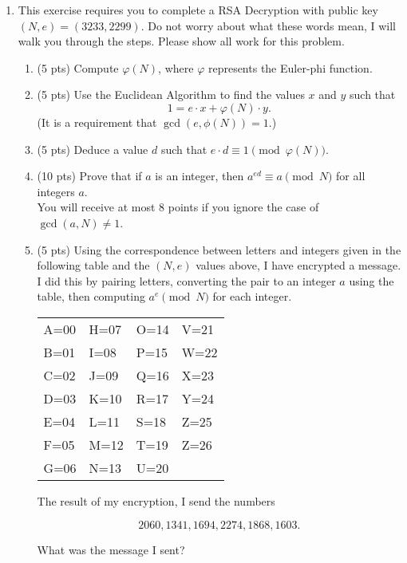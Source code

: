 \documentclass[12pt]{article}
\begin{document}
	\begin{enumerate}
		\item This exercise requires you to complete a RSA Decryption with public key $(N,e)=(3233,2299)$.  Do not worry about what these words mean, I will walk you through the steps. Please show all work for this problem.
		\begin{enumerate}
			\item (5 pts) Compute $\varphi(N)$, where $\varphi$ represents the Euler-phi function.
			\vfill
			\item (5 pts) Use the Euclidean Algorithm to find the values $x$ and $y$ such that
			\[1 = e\cdot x+\varphi(N)\cdot y.\]
			(It is a requirement that $\gcd(e,\phi(N))=1$.)
			\vfill 
			\item (5 pts) Deduce a value $d$ such that $e\cdot d\equiv 1\pmod{\varphi(N)}$.
			\vfill 
			\newpage 
			\item (10 pts) Prove that if $a$ is an integer, then $a^{ed}\equiv a\pmod N$ for all integers $a$.\\
			You will receive at most 8 points if you ignore the case of $\gcd(a,N)\neq 1$.
			\vfill
			\item (5 pts) Using the correspondence between letters and integers given in the following table and the $(N,e)$ values above, I have encrypted a message. I did this by pairing letters, converting the pair to an integer $a$ using the table, then computing $a^e\pmod N$ for each integer.
			\begin{center}
				\begin{tabular}{llll}
					A=00&H=07&O=14&V=21\\
					B=01&I=08&P=15&W=22\\
					C=02&J=09&Q=16&X=23\\
					D=03&K=10&R=17&Y=24\\
					E=04&L=11&S=18&Z=25\\
					F=05&M=12&T=19&{\color{white}Z}=26\\
					G=06&N=13&U=20
				\end{tabular}
			\end{center}
			The result of my encryption, I send the numbers
			
			\[2060, 1341, 1694, 2274, 1868, 1603.\]
			
			What was the message I sent? 
			

\end{enumerate}
\end{enumerate}
\end{document}
